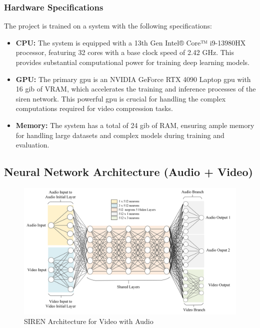\subsubsection{Hardware Specifications}
The project is trained on a system with the following specifications:
    \begin{itemize}
        \item \textbf{CPU:} The system is equipped with a 13th Gen Intel® Core™ i9-13980HX processor, featuring 32 cores with a base clock speed of 2.42 GHz. This provides substantial computational power for training deep learning models.
        \item \textbf{GPU:} The primary \gls{gpu} is an NVIDIA GeForce RTX 4090 Laptop \gls{gpu} with 16 \gls{gib} of VRAM, which accelerates the training and inference processes of the \gls{siren} network. This powerful \gls{gpu} is crucial for handling the complex computations required for video compression tasks.
        \item \textbf{Memory:} The system has a total of 24 \gls{gib} of RAM, ensuring ample memory for handling large datasets and complex models during training and evaluation.
    \end{itemize}




\subsection{Neural Network Architecture (Audio + Video)}
\begin{figure}[H]
    \centering
    \includegraphics[width=\linewidth]{assets/audio_video_neural.png}
    \caption{SIREN Architecture for Video with Audio}
    \label{fig:arch-audio}
\end{figure}

